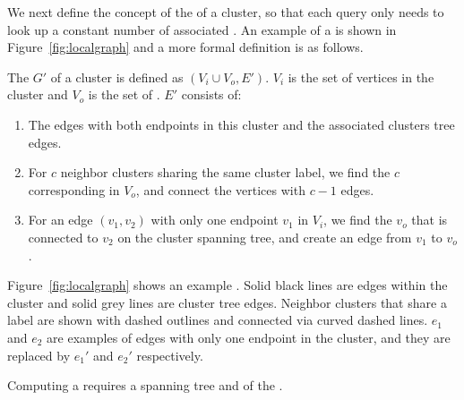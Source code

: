 We next define the concept of the \localgraph{} of a cluster, so that each query only needs to look up a constant number of associated .
An example of a \localgraph{} is shown in Figure~\ref{fig:localgraph} and a more formal definition is as follows.

\begin{definition}[\localgraph]
The \localgraph{} $G'$ of a cluster is defined as $(V_i \cup V_o,E')$. $V_i$ is the set of vertices in the cluster and $V_o$ is the set of \outvers{}. $E'$ consists of:
\begin{enumerate}
  \item The edges with both endpoints in this cluster and the associated clusters tree edges.
  \item For $c$ neighbor clusters sharing the same cluster label, we find the $c$ corresponding \outvers{} in $V_o$, and connect the vertices with $c-1$ edges.
  \item For an edge $(v_1, v_2)$ with only one endpoint $v_1$ in $V_i$, we find the \outver{} $v_o$ that is connected to $v_2$ on the cluster spanning tree, and create an edge from $v_1$ to $v_o$.
\end{enumerate}
\end{definition}

Figure~\ref{fig:localgraph} shows an example \localgraph{}.
Solid black lines are edges within the cluster and solid grey lines are cluster tree edges.  Neighbor clusters that share a label are shown with dashed outlines and connected via curved dashed lines.  $e_1$ and $e_2$ are examples of edges with only one endpoint in the cluster, and they are replaced by $e_1'$ and $e_2'$ respectively.

Computing a  requires a spanning tree and \imprep{} of the \clustergraph{}.

